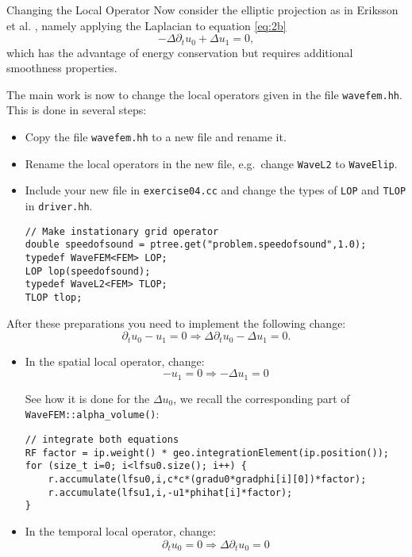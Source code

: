 \documentclass[12pt,a4paper]{article}
\begin{document}
\begin{Exercise}{Changing the Local Operator}
  Now consider the elliptic projection as in Eriksson et
  al. \cite{Eriksson}, namely applying the Laplacian to equation
  \eqref{eq:2b}
  \begin{equation}\label{eq:elip}
    -\Delta \partial_t u_0 + \Delta u_1 = 0,
  \end{equation}
  which has the advantage of energy conservation but requires
  additional smoothness properties.


  The main work is now to change the local operators given in the file
  \lstinline{wavefem.hh}. This is done in several steps:
  \begin{itemize}
  \item Copy the file \lstinline{wavefem.hh} to a new file and rename
    it.
  \item Rename the local operators in the new file, e.g.~change
    \lstinline{WaveL2} to \lstinline{WaveElip}.
  \item Include your new file in \lstinline{exercise04.cc} and change
    the types of \lstinline{LOP} and \lstinline{TLOP} in
    \lstinline{driver.hh}.
  \begin{lstlisting}
// Make instationary grid operator
double speedofsound = ptree.get("problem.speedofsound",1.0);
typedef WaveFEM<FEM> LOP;
LOP lop(speedofsound);
typedef WaveL2<FEM> TLOP;
TLOP tlop;
  \end{lstlisting}
  \end{itemize}

  After these preparations you need to implement the following change:
  $$ \partial_t u_0 - u_1 = 0 \Rightarrow \Delta \partial_t u_0 -
  \Delta u_1 = 0.$$

  \begin{itemize}
  \item In the spatial local operator, change:
    $$ - u_1 = 0 \Rightarrow -  \Delta u_1 = 0$$

    See how it is done for the $\Delta u_0$, we recall the
    corresponding part of \lstinline{WaveFEM::alpha_volume()}:
  \begin{lstlisting}
// integrate both equations
RF factor = ip.weight() * geo.integrationElement(ip.position());
for (size_t i=0; i<lfsu0.size(); i++) {
	r.accumulate(lfsu0,i,c*c*(gradu0*gradphi[i][0])*factor);
	r.accumulate(lfsu1,i,-u1*phihat[i]*factor);
}
  \end{lstlisting}

  \item In the temporal local operator, change:
    $$ \partial_t u_0  = 0 \Rightarrow \Delta \partial_t u_0= 0$$


\end{itemize}
\end{Exercise}
\end{document}
